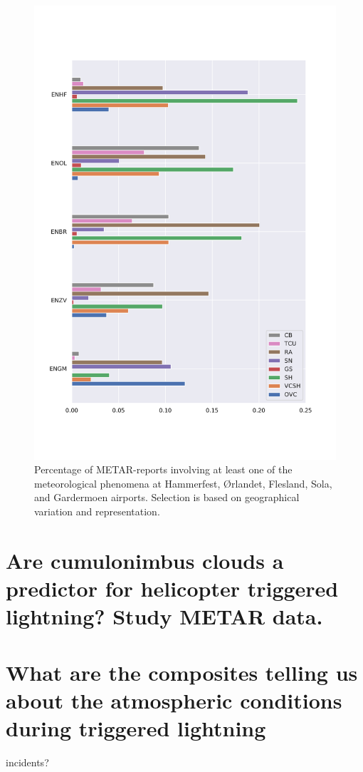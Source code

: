\begin{figure}
    \centering
    \includegraphics[width=.9\textwidth]{Figures/METAR_airports.pdf}
    \caption{Percentage of METAR-reports involving at least one of the meteorological phenomena at Hammerfest, Ørlandet, Flesland, Sola, and Gardermoen airports. Selection is based on geographical variation and representation.}
    \label{fig:metarclimat}
\end{figure}


\section{Are cumulonimbus clouds a predictor for helicopter triggered lightning? Study METAR data.}



\section{What are the composites telling us about the atmospheric conditions during triggered lightning} incidents?

